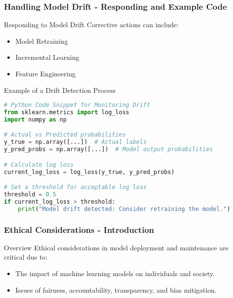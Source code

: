 \documentclass[aspectratio=169]{beamer}
\begin{document}
\begin{frame}[fragile]
    \frametitle{Handling Model Drift - Responding and Example Code}
    
    \begin{block}{Responding to Model Drift}
        Corrective actions can include:
        \begin{itemize}
            \item Model Retraining
            \item Incremental Learning
            \item Feature Engineering
        \end{itemize}
    \end{block}
    
    \begin{block}{Example of a Drift Detection Process}
        \begin{lstlisting}[language=Python]
# Python Code Snippet for Monitoring Drift
from sklearn.metrics import log_loss
import numpy as np

# Actual vs Predicted probabilities
y_true = np.array([...])  # Actual labels
y_pred_probs = np.array([...])  # Model output probabilities

# Calculate log loss
current_log_loss = log_loss(y_true, y_pred_probs)

# Set a threshold for acceptable log loss
threshold = 0.5
if current_log_loss > threshold:
    print("Model drift detected: Consider retraining the model.")
        \end{lstlisting}
    \end{block}
\end{frame}

\begin{frame}[fragile]
    \frametitle{Ethical Considerations - Introduction}
    \begin{block}{Overview}
        Ethical considerations in model deployment and maintenance are critical due to:
        \begin{itemize}
            \item The impact of machine learning models on individuals and society.
            \item Issues of fairness, accountability, transparency, and bias mitigation.
        \end{itemize}
    \end{block}
\end{frame}
\end{document}
